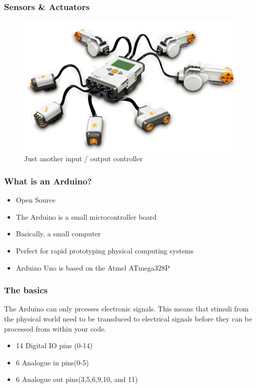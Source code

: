 \begin{frame}
	\frametitle{Sensors \& Actuators}
	\begin{figure}
		\includegraphics[scale=.15]{assets/nxt}  
		\caption{Just another input / output controller }
	\end{figure}
\end{frame}


\begin{frame}
  \frametitle{What is an Arduino?}
  \begin{itemize}
    \item Open Source
    \item The Arduino is a small microcontroller board
    \item Basically, a small computer 
    \item Perfect for rapid prototyping physical computing systems
    \item Arduino Uno is based on the Atmel ATmega328P
  \end{itemize}
\end{frame}



\begin{frame}
  \frametitle{The basics}  
  The Arduino can only prcesses electronic signals. This means that stimuli from the physical world need to be transduced to electrical signals before they can be processed from within your code. 
  
  \begin{itemize}
    \item 14 Digital IO pins (0-14)
    \item 6 Analogue in pins(0-5)
    \item 6 Analogue out pins(3,5,6,9,10, and 11) ~
  \end{itemize}
\end{frame}

